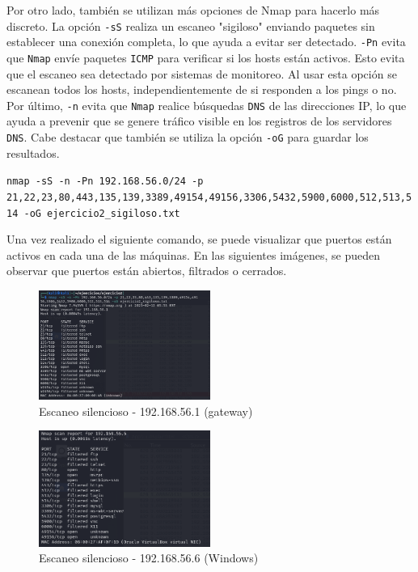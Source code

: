 \documentclass[a4paper,12pt]{article} %
\begin{document}
    Por otro lado, también se utilizan más opciones de Nmap para hacerlo más discreto. La opción \texttt{-sS} realiza un escaneo "sigiloso" enviando paquetes sin establecer una conexión completa, lo que ayuda a evitar ser detectado. \texttt{-Pn} evita que \texttt{Nmap} envíe paquetes \texttt{ICMP} para verificar si los hosts están activos. Esto evita que el escaneo sea detectado por sistemas de monitoreo. Al usar esta opción se escanean todos los hosts, independientemente de si responden a los pings o no. Por último, \texttt{-n} evita que \texttt{Nmap} realice búsquedas \texttt{DNS} de las direcciones IP, lo que ayuda a prevenir que se genere tráfico visible en los registros de los servidores \texttt{DNS}. Cabe destacar que también se utiliza la opción \texttt{-oG} para guardar los resultados.
    
    \begin{center}
    \texttt{nmap -sS -n -Pn 192.168.56.0/24 -p 21,22,23,80,443,135,139,3389,49154,49156,3306,5432,5900,6000,512,513,514 -oG ejercicio2\_sigiloso.txt}
    \end{center}

    Una vez realizado el siguiente comando, se puede visualizar que puertos están activos en cada una de las máquinas. En las siguientes imágenes, se pueden observar que puertos están abiertos, filtrados o cerrados. 

        \begin{figure} [hp!]
         \centering
         \includegraphics[width=0.5\textwidth]{Imagenes/silencioso1.png}
         \caption{Escaneo silencioso - 192.168.56.1 (gateway)}
         \label{fig:wireshark2}
        \end{figure}

        \begin{figure} [hp!]
         \centering
         \includegraphics[width=0.5\textwidth]{Imagenes/sil2.png}
         \caption{Escaneo silencioso - 192.168.56.6 (Windows)}
         \label{fig:wireshark2}
        \end{figure}
        
\end{document}
